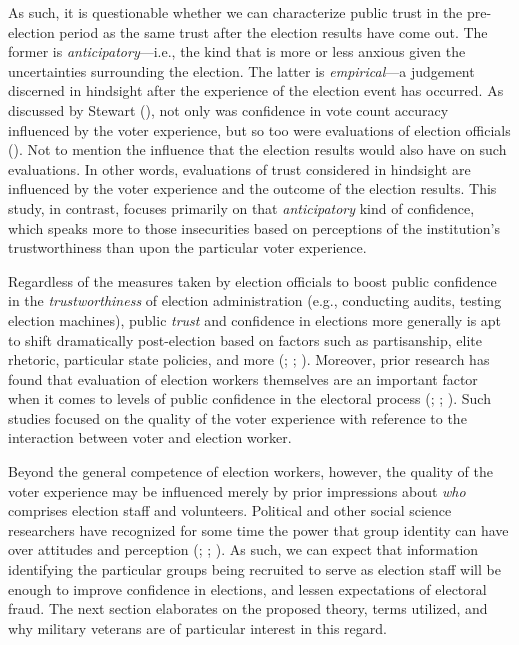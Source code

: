\documentclass[
  12pt,
  letterpaper,
]{article}
\begin{document}
As such, it is questionable whether we can characterize public trust in
the pre-election period as the same trust after the election results
have come out. The former is \emph{anticipatory}---i.e., the kind that
is more or less anxious given the uncertainties surrounding the
election. The latter is \emph{empirical}---a judgement discerned in
hindsight after the experience of the election event has occurred. As
discussed by Stewart (), not only was
confidence in vote count accuracy influenced by the voter experience,
but so too were evaluations of election officials
(). Not to mention the
influence that the election results would also have on such evaluations.
In other words, evaluations of trust considered in hindsight are
influenced by the voter experience and the outcome of the election
results. This study, in contrast, focuses primarily on that
\emph{anticipatory} kind of confidence, which speaks more to those
insecurities based on perceptions of the institution's trustworthiness
than upon the particular voter experience.

Regardless of the measures taken by election officials to boost public
confidence in the \emph{trustworthiness} of election administration
(e.g., conducting audits, testing election machines), public
\emph{trust} and confidence in elections more generally is apt to shift
dramatically post-election based on factors such as partisanship, elite
rhetoric, particular state policies, and more
(;
;
). Moreover, prior
research has found that evaluation of election workers themselves are an
important factor when it comes to levels of public confidence in the
electoral process (;
;
).
Such studies focused on the quality of the voter experience with
reference to the interaction between voter and election worker.

Beyond the general competence of election workers, however, the quality
of the voter experience may be influenced merely by prior impressions
about \emph{who} comprises election staff and volunteers. Political and
other social science researchers have recognized for some time the power
that group identity can have over attitudes and perception
(;
;
). As such, we can
expect that information identifying the particular groups being
recruited to serve as election staff will be enough to improve
confidence in elections, and lessen expectations of electoral fraud. The
next section elaborates on the proposed theory, terms utilized, and why
military veterans are of particular interest in this regard.
\end{document}
